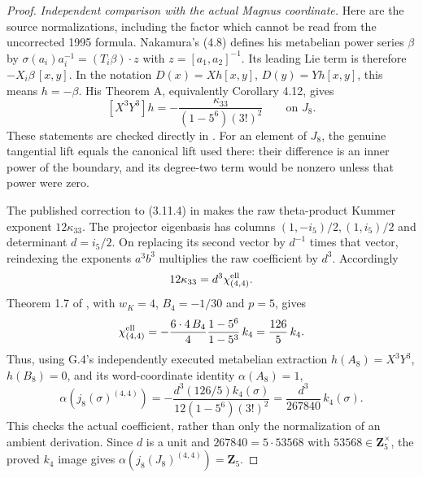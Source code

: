 \begin{proof}
\emph{Independent comparison with the actual Magnus coordinate.}
Here are the source normalizations, including the factor
which cannot be read from the uncorrected 1995 formula.
Nakamura's (4.8) defines his metabelian power series
$\beta$ by
$\sigma(a_i)a_i^{-1}=(T_i\beta)\cdot z$ with
$z=[a_1,a_2]^{-1}$. Its leading Lie term is therefore
$-X_i\beta\,[x,y]$. In the notation
$D(x)=Xh[x,y]$, $D(y)=Yh[x,y]$, this means
$h=-\beta$. His Theorem A, equivalently Corollary 4.12,
gives
\[
 [X^3Y^3]h
       =-\frac{\kappa_{33}}{(1-5^6)(3!)^2}
       \qquad\text{on }J_8.
\]
These statements are checked directly in
\citet[Sections 4.3--4.9 and Corollary 4.12]{Nakamura1995}.
For an element of $J_8$, the genuine tangential lift
equals the canonical lift used there: their difference
is an inner power of the boundary, and its degree-two
term would be nonzero unless that power were zero.

The published correction to (3.11.4) in
\citet[p.~492, Errata to N95]{fghNakamura2013}
makes the raw theta-product Kummer exponent
$12\kappa_{33}$. The projector eigenbasis has columns
$(1,-i_5)/2,(1,i_5)/2$ and determinant $d=i_5/2$.
On replacing its second vector by $d^{-1}$ times that
vector, reindexing the exponents $a^3b^3$ multiplies
the raw coefficient by $d^3$. Accordingly
\[
 12\kappa_{33}=d^3\chi^{\rm ell}_{(4,4)}.
\]
Theorem 1.7 of \citet{fghIshiiGoto}, with
$w_K=4$, $B_4=-1/30$ and $p=5$, gives
\[
 \chi^{\rm ell}_{(4,4)}
 =-\frac{6\cdot4\,B_4}{4}
       \frac{1-5^6}{1-5^3}\,k_4
 =\frac{126}{5}\,k_4.
\]
Thus, using G.4's independently executed metabelian
extraction $h(A_8)=X^3Y^3$, $h(B_8)=0$, and its
word-coordinate identity $\alpha(A_8)=1$,
\[
 \alpha(j_8(\sigma)^{(4,4)})
 =-\frac{d^3(126/5)k_4(\sigma)}
          {12(1-5^6)(3!)^2}
 =\frac{d^3}{267840}\,k_4(\sigma).
\]
This checks the actual coefficient, rather than only
the normalization of an ambient derivation.
Since $d$ is a unit and $267840=5\cdot53568$ with
$53568\in\mathbf Z_5^\times$, the proved $k_4$ image
gives $\alpha(j_8(J_8)^{(4,4)})=\mathbf Z_5$.


\end{proof}

